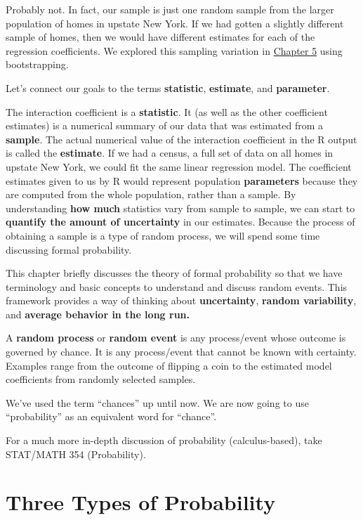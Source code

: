 \documentclass[
]{book}
\begin{document}
Probably not. In fact, our sample is just one random sample from the larger population of homes in upstate New York. If we had gotten a slightly different sample of homes, then we would have different estimates for each of the regression coefficients. We explored this sampling variation in \protect\hyperlink{randvariability}{Chapter 5} using bootstrapping.

Let's connect our goals to the terms \textbf{statistic}, \textbf{estimate}, and \textbf{parameter}.

The interaction coefficient is a \textbf{statistic}. It (as well as the other coefficient estimates) is a numerical summary of our data that was estimated from a \textbf{sample}. The actual numerical value of the interaction coefficient in the R output is called the \textbf{estimate}. If we had a census, a full set of data on all homes in upstate New York, we could fit the same linear regression model. The coefficient estimates given to us by R would represent population \textbf{parameters} because they are computed from the whole population, rather than a sample. By understanding \textbf{how much} statistics vary from sample to sample, we can start to \textbf{quantify the amount of uncertainty} in our estimates. Because the process of obtaining a sample is a type of random process, we will spend some time discussing formal probability.

This chapter briefly discusses the theory of formal probability so that we have terminology and basic concepts to understand and discuss random events. This framework provides a way of thinking about \textbf{uncertainty}, \textbf{random variability}, and \textbf{average behavior in the long run.}

A \textbf{random process} or \textbf{random event} is any process/event whose outcome is governed by chance. It is any process/event that cannot be known with certainty. Examples range from the outcome of flipping a coin to the estimated model coefficients from randomly selected samples.

We've used the term ``chances'' up until now. We are now going to use ``probability'' as an equivalent word for ``chance''.

For a much more in-depth discussion of probability (calculus-based), take STAT/MATH 354 (Probability).

\hypertarget{three-types-of-probability}{%
\section{Three Types of Probability}\label{three-types-of-probability}}
\end{document}

